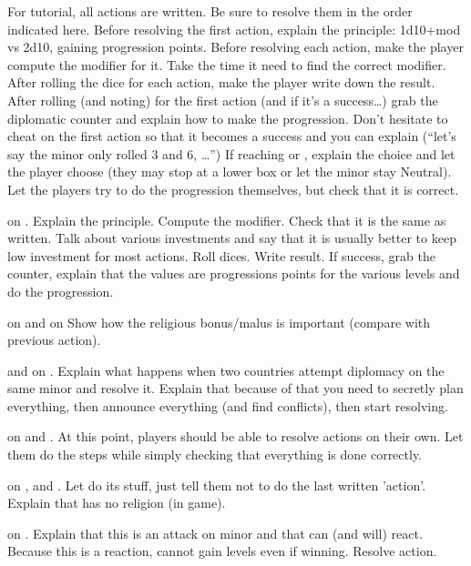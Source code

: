 \aparag For tutorial, all actions are written. Be sure to resolve them in the
order indicated here.
\bparag Before resolving the first action, explain the principle: 1d10+mod vs
2d10, gaining progression points.
\bparag Before resolving each action, make the player compute the modifier for
it. Take the time it need to find the correct modifier.
\bparag After rolling the dice for each action, make the player write down the
result.
\bparag After rolling (and noting) for the first action (and if it's a
success\ldots) grab the diplomatic counter and explain how to make the
progression. Don't hesitate to cheat on the first action so that it becomes a
success and you can explain (``let's say the minor only rolled 3 and 6,
\ldots'')
\bparag If reaching \SUB or \RM, explain the choice and let the player
choose (they may stop at a lower box or let the minor stay Neutral).
\bparag Let the players try to do the progression themselves, but check that
it is correct.

\aparag \POL on \paysBrandebourg.
\bparag Explain the principle. Compute the modifier. Check that it is the same
as written.
\bparag Talk about various investments and say that it is usually better to
keep low investment for most actions.
\bparag Roll dices. Write result.
\bparag If success, grab the counter, explain that the values are progressions
points for the various levels and do the progression.

\aparag \POR on \paysMaroc and \VEN on \paysPerse
\bparag Show how the religious bonus/malus is important (compare with previous
action).

\aparag \RUS and \TUR on \paysKazan.
\bparag Explain what happens when two countries attempt diplomacy on the same
minor and resolve it.
\bparag Explain that because of that you need to secretly plan everything,
then announce everything (and find conflicts), then start resolving.

\aparag \TUR on \paysAlgerie and \paysDamas.
\bparag At this point, players should be able to resolve actions on their
own. Let them do the steps while simply checking that everything is done
correctly.

\aparag \HIS on \paysPapaute, \paysSuisse and \paysLorraine.
\bparag Let \HIS do its stuff, just tell them not to do the last written
'action'.
\bparag Explain that \paysSuisse has no religion (in game).

\aparag \FRA on \paysGenes.
\bparag Explain that this is an attack on \HIS minor and that \HIS can (and
will) react. Because this is a reaction, \HIS cannot gain levels even if
winning.
\bparag Resolve action.

